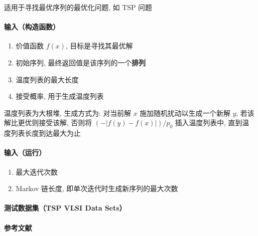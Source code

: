 适用于寻找最优序列的最优化问题, 如 TSP 问题

\paragraph{输入（构造函数）}

\begin{enumerate}
    \item[\verb|f|] 价值函数 \(f(x)\), 目标是寻找其最优解
    \item[\verb|init|] 初始序列, 最终返回值是该序列的一个\textbf{排列}
    \item[\verb|L|] 温度列表的最大长度
    \item[\verb|p0|] 接受概率, 用于生成温度列表
\end{enumerate}

温度列表为大根堆, 生成方式为: 对当前解 \(x\) 施加随机扰动以生成一个新解 \(y\), 若该解比更优则接受该解, 否则将 \((-|f(y)-f(x)|)/p_0\) 插入温度列表中, 直到温度列表长度到达最大为止

\paragraph{输入（运行）}

\begin{enumerate}
    \item[\verb|K|] 最大迭代次数
    \item[\verb|M|] Markov 链长度, 即单次迭代时生成新序列的最大次数
\end{enumerate}

\paragraph{测试数据集（TSP VLSI Data Sets）} \cite{tspvlsidatasets}

\paragraph{参考文献} \cite{zhan2016list}
